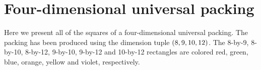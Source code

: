 \section{Four-dimensional universal packing}\label{appendix-B}
\noindent Here we present all of the squares of a four-dimensional universal packing. The packing has been produced using the dimension tuple $\left( 8, 9, 10, 12 \right)$. The 8-by-9, 8-by-10, 8-by-12, 9-by-10, 9-by-12 and 10-by-12 rectangles are colored red, green, blue, orange, yellow and violet, respectively.


